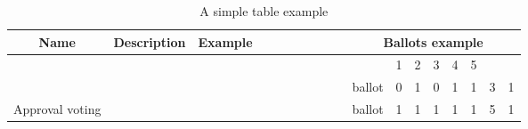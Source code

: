 
\begin{table}[h]
	\centering
	\caption{A simple table example}
	\label{tab:simple}
	\begin{tabular}{|c|c| c| c|c|c|c|c|c|c| c|c c c c c| c|c|}
		\hline
		\textbf{Name} & \textbf{Description} & \textbf{Example} & \numfields & \minvalue & \maxvalue & \uniquevalues & \costexponent & \minvaluesum & \maxvaluesum & \multicolumn{8}{c|}{Ballots example} \\  
		\hline
		&&&&&&&&&&& 1 & 2 & 3 & 4 & 5 & \totalvaluesum & \validvote \\
		\hline
		&&&&&&&&&& ballot & 0 & 1 & 0 & 1 & 1 & 3 & 1 \\	
		Approval voting &&&&&&&&&& ballot & 1 & 1 & 1 & 1 & 1 & 5 & 1 \\			
		\hline
	\end{tabular}
\end{table}